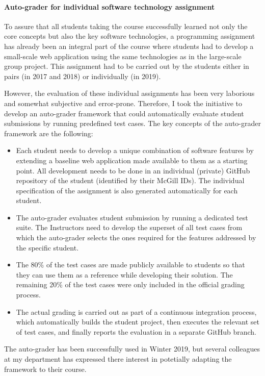 \documentclass[a4paper,11pt]{report}
\begin{document}
\paragraph{Auto-grader for individual software technology assignment}
To assure that all students taking the course successfully learned not only the core concepts but also the key software technologies, a programming assignment has already been an integral part of the course where students had to develop a small-scale web application using the same technologies as in the large-scale group project. This assignment had to be carried out by the students either in pairs (in 2017 and 2018) or individually (in 2019). 

However, the evaluation of these individual assignments has been very laborious and somewhat subjective and error-prone. Therefore, I took the initiative to develop an auto-grader framework that could automatically evaluate student submissions by running predefined test cases. The key concepts of the auto-grader framework are the following:

\begin{itemize}
\item Each student needs to develop a unique combination of software features by extending a baseline web application made available to them as a starting point. All development needs to be done in an individual (private) GitHub repository of the student (identified by their McGill IDs). The individual specification of the assignment is also generated automatically for each student. 
\item The auto-grader evaluates student submission by running a dedicated test suite. The Instructors need to develop the superset of all test cases from which the auto-grader selects the ones required for the features addressed by the specific student. 
\item The 80\% of the test cases are made publicly available to students so that they can use them as a reference while developing their solution. The remaining 20\% of the test cases were only included in the official grading process. 
\item The actual grading is carried out as part of a continuous integration process, which automatically builds the student project, then executes the relevant set of test cases, and finally reports the evaluation in a separate GitHub branch.
\end{itemize}

The auto-grader has been successfully used in Winter 2019, but several colleagues at my department has expressed there interest in potetially adapting the framework to their course. 
\end{document}
